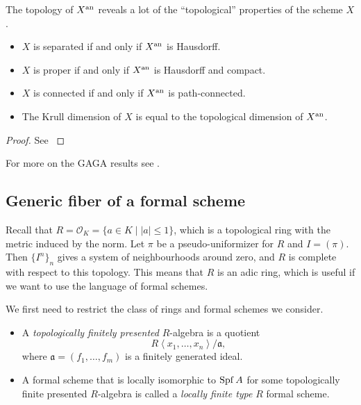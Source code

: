 \begin{theorem}
	The topology of $X{}^{\text{an}}$ reveals a lot of the ``topological'' properties of the scheme $X$. 
	\begin{itemize}
		\item $X$ is separated if and only if $X{}^{\text{an}}$ is Hausdorff. 
		\item $X$ is proper if and only if $X{}^{\text{an}}$ is Hausdorff and compact. 
		\item  $X$ is connected if and only if $X{}^{\text{an}}$ is path-connected. 
		\item The Krull dimension of  $X$ is equal to the topological dimension of $X{}^{\text{an}}$. 
	\end{itemize}
\end{theorem}
\begin{proof}
	See \cite[][thm.\ 3.4.8]{berkovichSpectralTheoryAnalytic2012}
\end{proof}

For more on the GAGA results see \cite[][sec.\ 3.4]{berkovichSpectralTheoryAnalytic2012}.

\subsection{Generic fiber of a formal scheme} \label{sec:generic_fiber_of_a_formal_scheme}

Recall that $R = \mathcal{O}_K = \{a \in K \mid |a| \le 1\} $, which is a topological ring with the metric induced by the norm. 
Let $\pi$ be a pseudo-uniformizer for $R$ and $I = (\pi)$. 
Then $\{I^{n}\}_n$ gives a system of neighbourhoods around zero, and $R$ is complete with respect to this topology. 
This means that $R$ is an adic ring, which is useful if we want to use the language of formal schemes. 

We first need to restrict the class of rings and formal schemes we consider. 
\begin{definition}\label{def:topologically_finite_presentation_algebra}
	\begin{itemize}
		\item 
	A \emph{topologically finitely presented} $R$-algebra is a quotient \[
		R\left<x_1, \ldots, x_n \right> / \mathfrak{a} 
	,\] where $\mathfrak{a}  = (f_1, \ldots, f_m)$ is a finitely generated ideal. 
\item A formal scheme that is locally isomorphic to $\operatorname{Spf} A$ for some topologically finite presented $R$-algebra is called a \emph{locally finite type} $R$ formal scheme. 
	\end{itemize}

\end{definition}

